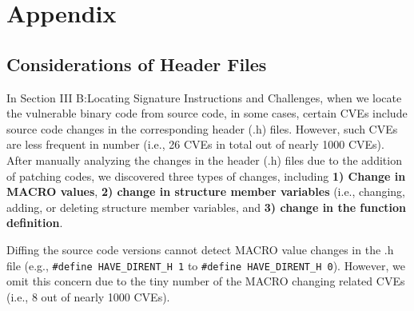 \section{Appendix}
\subsection{Considerations of Header Files} 
In %
Section III B:Locating Signature Instructions and Challenges, when we locate the vulnerable binary code from source code, in some cases, certain CVEs include source code changes in the corresponding header (.h) files. 
However, such CVEs are less frequent in number (i.e., 26 CVEs in total out of nearly 1000 CVEs). 
After manually analyzing the changes in the header (.h) files due to the addition of patching codes, we discovered three types of changes, including \textbf{1) Change in MACRO values}, \textbf{2) change in structure member variables} (i.e., changing, adding, or deleting structure member variables, and \textbf{3) change in the function definition}. 




Diffing the source code versions cannot detect MACRO value changes in the .h file (e.g., \texttt{\#define HAVE\_DIRENT\_H 1} to \texttt{\#define HAVE\_DIRENT\_H 0}).
However, we omit this concern due to the tiny number of the MACRO changing related CVEs (i.e., 8 out of nearly 1000 CVEs). 

